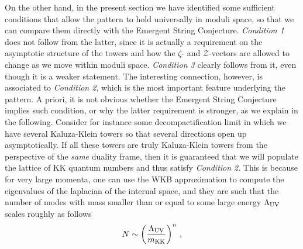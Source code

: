 On the other hand, in the present section  we have identified some sufficient conditions that allow the pattern to hold universally in moduli space, so that we can compare them directly with the Emergent String Conjecture. \emph{Condition 1} does not follow from the latter, since it is actually a requirement on the asymptotic structure of the towers and how the $\zeta$- and $\mathcal{Z}$-vectors are allowed to change as we move within moduli space. \emph{Condition 3} clearly follows from it, even though it is a weaker statement. The interesting connection, however, is associated to \emph{Condition 2}, which is the most important feature underlying the pattern. A priori, it is not obvious whether the Emergent String Conjecture implies such condition, or why the latter requirement is stronger, as we explain in the following. Consider for instance some decompactification limit in which we have several Kaluza-Klein towers so that several directions open up asymptotically. If all these towers are truly Kaluza-Klein towers from the perspective of the \emph{same} duality frame, then it is guaranteed that we will populate the lattice of KK quantum numbers and thus satisfy \emph{Condition 2}. This is because for very large momenta, one can use the WKB approximation to compute the eigenvalues of the laplacian of the internal space, and they are such that the number of modes with mass smaller than or equal to some large energy $\Lambda_{\rm UV}$ scales roughly as follows
%
\begin{equation}
	N \sim \left( \frac{\Lambda_{\rm UV}}{m_{\rm KK}}\right)^n\, ,
\end{equation}
%
